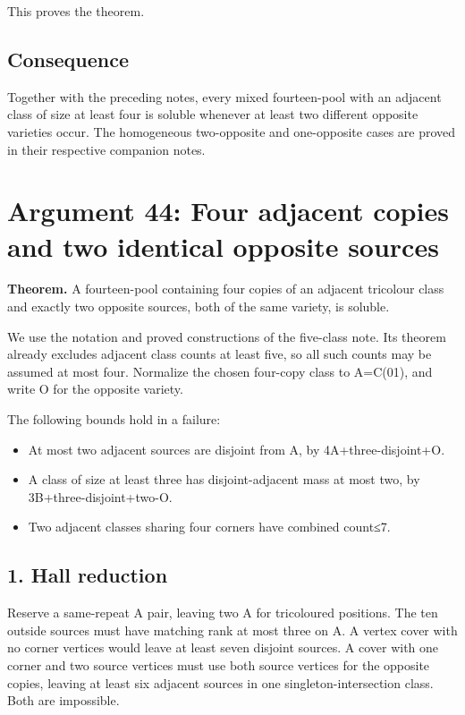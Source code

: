 \documentclass[
  10pt,
]{article}
\providecommand{\tightlist}{%
  \setlength{\itemsep}{0pt}\setlength{\parskip}{0pt}}
\begin{document}
This proves the theorem.

\hypertarget{consequence-3}{%
\subsection*{Consequence}\label{consequence-3}}

Together with the preceding notes, every mixed fourteen-pool with an
adjacent class of size at least four is soluble whenever at least two
different opposite varieties occur. The homogeneous two-opposite and
one-opposite cases are proved in their respective companion notes.

\hypertarget{arg-44}{%
\section{Argument 44: Four adjacent copies and two identical opposite
sources}\label{arg-44}}

\textbf{Theorem.} A fourteen-pool containing four copies of an adjacent
tricolour class and exactly two opposite sources, both of the same
variety, is soluble.

We use the notation and proved constructions of the five-class note. Its
theorem already excludes adjacent class counts at least five, so all
such counts may be assumed at most four. Normalize the chosen four-copy
class to A=C(01), and write O for the opposite variety.

The following bounds hold in a failure:

\begin{itemize}
\tightlist
\item
  At most two adjacent sources are disjoint from A, by
  4A+three-disjoint+O.
\item
  A class of size at least three has disjoint-adjacent mass at most two,
  by 3B+three-disjoint+two-O.
\item
  Two adjacent classes sharing four corners have combined count≤7.
\end{itemize}

\hypertarget{hall-reduction}{%
\subsection*{1. Hall reduction}\label{hall-reduction}}

Reserve a same-repeat A pair, leaving two A for tricoloured positions.
The ten outside sources must have matching rank at most three on A. A
vertex cover with no corner vertices would leave at least seven disjoint
sources. A cover with one corner and two source vertices must use both
source vertices for the opposite copies, leaving at least six adjacent
sources in one singleton-intersection class. Both are impossible.
\end{document}
